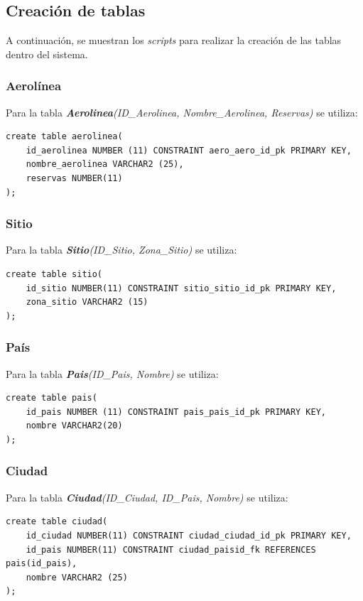 \documentclass{article}
\begin{document}
\subsection{Creación de tablas}

A continuación, se muestran los \textit{scripts} para realizar la creación de las tablas dentro del sistema.

\subsubsection{Aerolínea}\label{sec:1}

Para la tabla \textit{\textbf{Aerolinea}(ID\_Aerolinea, Nombre\_Aerolinea, Reservas)} se utiliza:

\begin{lstlisting}
create table aerolinea(
    id_aerolinea NUMBER (11) CONSTRAINT aero_aero_id_pk PRIMARY KEY,
    nombre_aerolinea VARCHAR2 (25),
    reservas NUMBER(11)
);
\end{lstlisting}

\subsubsection{Sitio}

Para la tabla \textit{\textbf{Sitio}(ID\_Sitio, Zona\_Sitio)} se utiliza:

\begin{lstlisting}
create table sitio(
    id_sitio NUMBER(11) CONSTRAINT sitio_sitio_id_pk PRIMARY KEY,
    zona_sitio VARCHAR2 (15)
);
\end{lstlisting}

\subsubsection{País}

Para la tabla \textit{\textbf{Pais}(ID\_Pais, Nombre)} se utiliza:
\begin{lstlisting}
create table pais(
    id_pais NUMBER (11) CONSTRAINT pais_pais_id_pk PRIMARY KEY,
    nombre VARCHAR2(20)
);
\end{lstlisting}


\subsubsection{Ciudad}

Para la tabla \textit{\textbf{Ciudad}(ID\_Ciudad, ID\_Pais, Nombre)} se utiliza:
\begin{lstlisting}
create table ciudad(
    id_ciudad NUMBER(11) CONSTRAINT ciudad_ciudad_id_pk PRIMARY KEY,
    id_pais NUMBER(11) CONSTRAINT ciudad_paisid_fk REFERENCES pais(id_pais),
    nombre VARCHAR2 (25)
);
\end{lstlisting}
\end{document}
